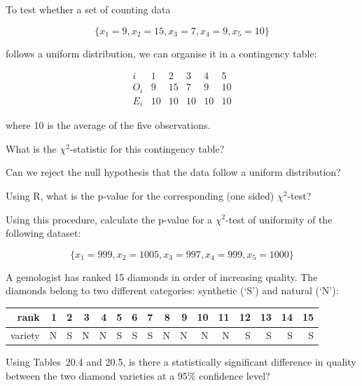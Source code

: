 \documentclass{article}
\begin{document}
\begin{minipage}{15cm}
To test whether a set of counting data

\[
\{x_1=9, x_2=15, x_3=7, x_4=9, x_5=10\}
\]

follows a uniform distribution, we can organise it in a contingency table:

\[
\begin{array}{c|ccccc}
  i & 1 & 2 & 3 & 4 & 5 \\ \hline
  O_i & 9 & 15 & 7 & 9 & 10 \\
  E_i & 10 & 10 & 10 & 10 & 10
\end{array} \]

where 10 is the average of the five observations.\medskip

What is the \(\chi^2\)-statistic for this contingency table?\medskip

Can we reject the null hypothesis that the data follow a uniform
distribution?\medskip

Using R, what is the p-value for the corresponding (one sided)
\(\chi^2\)-test?\medskip

Using this procedure, calculate the p-value for a \(\chi^2\)-test of
uniformity of the following dataset:

\[
\{x_1=999, x_2=1005, x_3=997, x_4=999, x_5=1000\}
\]

\end{minipage}

\vspace{1cm}

\begin{minipage}{12cm}

  A gemologist has ranked 15 diamonds in order of increasing
  quality. The diamonds belong to two different categories: synthetic
  (`S') and natural (`N'):\medskip

    \begin{tabular}{@{}r@{~~}|r@{~~}r@{~~}r@{~~}r@{~~}r@{~~}r@{~~}r@{~~}r@{~~}r@{~~}r@{~~}r@{~~}r@{~~}r@{~~}r@{~~}r@{}}
      rank & 1 & 2 & 3 & 4 & 5 & 6 & 7 & 8 & 9 & 10 & 11 & 12 & 13 & 14 & 15 \\ \hline
      variety & N & S & N & N & S & S & S & N & N & N & N & S & S & S & S \\
    \end{tabular}\medskip

  Using Tables~20.4 and 20.5, is there a statistically significant
  difference in quality between the two diamond varieties at a 95\%
  confidence level?

\end{minipage}
\end{document}
